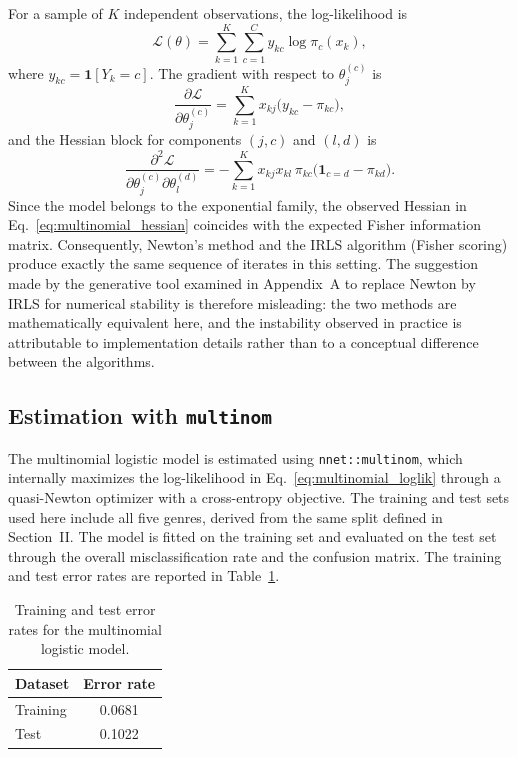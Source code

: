 For a sample of \(K\) independent observations, the log-likelihood is
\begin{equation}
\mathcal{L}(\theta) = \sum_{k=1}^{K}\sum_{c=1}^{C} y_{kc}\log\pi_c(x_k),
\label{eq:multinomial_loglik}
\end{equation}
where \(y_{kc} = \mathbf{1}[Y_k = c]\). The gradient with respect to \(\theta_j^{(c)}\) is
\begin{equation}
\frac{\partial \mathcal{L}}{\partial \theta_j^{(c)}} = \sum_{k=1}^{K} x_{kj}\bigl(y_{kc} - \pi_{kc}\bigr),
\label{eq:multinomial_gradient}
\end{equation}
and the Hessian block for components \((j,c)\) and \((l,d)\) is
\begin{equation}
\frac{\partial^2 \mathcal{L}}{\partial \theta_j^{(c)} \partial \theta_l^{(d)}} = -\sum_{k=1}^{K} x_{kj}x_{kl}\,\pi_{kc}\bigl(\mathbf{1}_{c=d} - \pi_{kd}\bigr).
\label{eq:multinomial_hessian}
\end{equation}
Since the model belongs to the exponential family, the observed Hessian in Eq.~\eqref{eq:multinomial_hessian} coincides with the expected Fisher information matrix. Consequently, Newton's method and the IRLS algorithm (Fisher scoring) produce exactly the same sequence of iterates in this setting. The suggestion made by the generative tool examined in Appendix~A to replace Newton by IRLS for numerical stability is therefore misleading: the two methods are mathematically equivalent here, and the instability observed in practice is attributable to implementation details rather than to a conceptual difference between the algorithms.

\subsection{Estimation with \texttt{multinom}}

The multinomial logistic model is estimated using \texttt{nnet::multinom}, which internally maximizes the log-likelihood in Eq.~\eqref{eq:multinomial_loglik} through a quasi-Newton optimizer with a cross-entropy objective. The training and test sets used here include all five genres, derived from the same split defined in Section~II. The model is fitted on the training set and evaluated on the test set through the overall misclassification rate and the confusion matrix. The training and test error rates are reported in Table~\ref{tab:multinom_errors}.

\begin{table}[!t]
\centering
\caption{Training and test error rates for the multinomial logistic model.}
\label{tab:multinom_errors}
\scriptsize
\begin{tabular}{lc}
\toprule
Dataset & Error rate \\
\midrule
Training & 0.0681 \\
Test     & 0.1022 \\
\bottomrule
\end{tabular}
\end{table}

